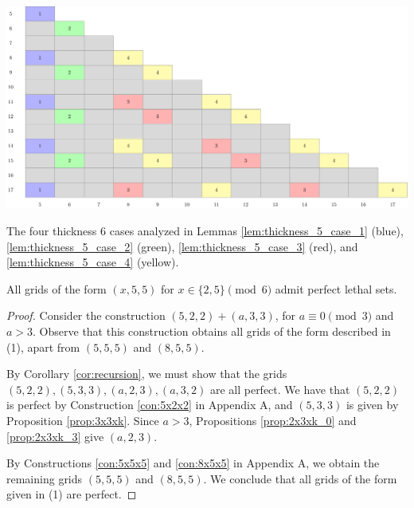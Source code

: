 \begin{table}[]
\centering
\includegraphics[width=\textwidth]{tables/4/thickness_5_cases.pdf}
\caption{The four thickness 6 cases analyzed in Lemmas \ref{lem:thickness_5_case_1} (blue), \ref{lem:thickness_5_case_2} (green), \ref{lem:thickness_5_case_3} (red), and \ref{lem:thickness_5_case_4} (yellow).}
\label{fig:thickness_5_cases}
\end{table}


\begin{lem}
\label{lem:thickness_5_case_1}
All grids of the form $(x,5,5)$ for $x \in \{2,5\} \pmod 6$ admit perfect lethal sets.
\end{lem}

\begin{proof}
Consider the construction $(5,2,2) + (a,3,3)$, for $a \equiv 0 \pmod 3$ and $a >3$. Observe that this construction obtains all grids of the form described in (1), apart from $(5,5,5)$ and $(8,5,5)$.

By Corollary \ref{cor:recursion}, we must show that the grids $(5,2,2), (5,3,3), (a,2,3), (a,3,2)$ are all perfect. We have that $(5,2,2)$ is perfect by Construction \ref{con:5x2x2} in Appendix A, and $(5,3,3)$ is given by Proposition \ref{prop:3x3xk}. Since $a >3$, Propositions \ref{prop:2x3xk_0} and \ref{prop:2x3xk_3} give $(a,2,3)$. 

By Constructions \ref{con:5x5x5} and \ref{con:8x5x5} in Appendix A, we obtain the remaining grids $(5,5,5)$ and $(8,5,5)$. We conclude that all grids of the form given in (1) are perfect.
\end{proof}

